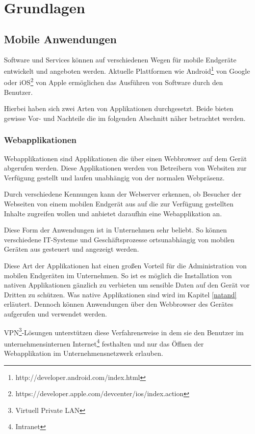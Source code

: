 \section{Grundlagen}

\subsection{Mobile Anwendungen}

Software und Services können auf verschiedenen Wegen für mobile Endgeräte entwickelt und angeboten werden. Aktuelle Plattformen wie Android\footnote{http://developer.android.com/index.html} von Google oder iOS\footnote{https://developer.apple.com/devcenter/ios/index.action} von Apple ermöglichen das Ausführen von Software durch den Benutzer.

Hierbei haben sich zwei Arten von Applikationen durchgesetzt. Beide bieten gewisse Vor- und Nachteile die im folgenden Abschnitt näher betrachtet werden.

\subsubsection{Webapplikationen}

Webapplikationen sind Applikationen die über einen Webbrowser auf dem Gerät abgerufen werden. Diese Applikationen werden von Betreibern von Websiten zur Verfügung gestellt und laufen unabhängig von der normalen Webpräsenz.

Durch verschiedene Kennungen kann der Webserver erkennen, ob Besucher der Webseiten von einem mobilen Endgerät aus auf die zur Verfügung gestellten Inhalte zugreifen wollen und anbietet daraufhin eine Webapplikation an.

Diese Form der Anwendungen ist in Unternehmen sehr beliebt. So können verschiedene IT-Systeme und Geschäftsprozesse ortsunabhängig von mobilen Geräten aus gesteuert und angezeigt werden.

Diese Art der Applikationen hat einen großen Vorteil für die Administration von mobilen Endgeräten im Unternehmen. So ist es möglich die Installation von nativen Applikationen gänzlich zu verbieten um sensible Daten auf den Gerät vor Dritten zu schützen. Was native Applikationen sind wird im Kapitel \ref{natand} erläutert. Dennoch können Anwendungen über den Webbrowser des Gerätes aufgerufen und verwendet werden.

VPN\footnote{Virtuell Private LAN}-Lösungen unterstützen diese Verfahrensweise in dem sie den Benutzer im unternehmensinternen Internet\footnote{Intranet} festhalten und nur das Öffnen der Webapplikation im Unternehmensnetzwerk erlauben.

